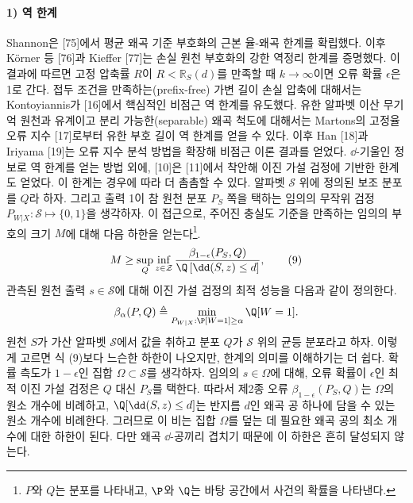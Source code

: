 \paragraph{1) 역 한계}
Shannon은 [75]에서 평균 왜곡 기준 부호화의 근본 율-왜곡 한계를 확립했다.
이후 Körner 등 [76]과 Kieffer [77]는 손실 원천 부호화의 강한 역정리 한계를 증명했다.
이 결과에 따르면 고정 압축률 $R$이 $R<\mathbb{R}_S(d)$를 만족할 때 $k\to\infty$이면 오류 확률 $\epsilon$은 1로 간다.
접두 조건을 만족하는(prefix-free) 가변 길이 손실 압축에 대해서는 Kontoyiannis가 [16]에서 핵심적인 비점근 역 한계를 유도했다.
유한 알파벳 이산 무기억 원천과 유계이고 분리 가능한(separable) 왜곡 척도에 대해서는 Martons의 고정율 오류 지수 [17]로부터 유한 부호 길이 역 한계를 얻을 수 있다.
이후 Han [18]과 Iriyama [19]는 오류 지수 분석 방법을 확장해 비점근 이론 결과를 얻었다.
$\dd$-기울인 정보로 역 한계를 얻는 방법 외에, [10]은 [11]에서 착안해 이진 가설 검정에 기반한 한계도 얻었다. 이 한계는 경우에 따라 더 촘촘할 수 있다.
알파벳 $\mathcal{S}$ 위에 정의된 보조 분포를 $Q$라 하자.
그리고 출력 1이 참 원천 분포 $P_S$ 쪽을 택하는 임의의 무작위 검정 $P_{W|X}:\mathcal{S}\mapsto\{0,1\}$을 생각하자.
이 접근으로, 주어진 충실도 기준을 만족하는 임의의 부호의 크기 $M$에 대해 다음 하한을 얻는다\footnote{$P$와 $Q$는 분포를 나타내고, $\P$와 $\Q$는 바탕 공간에서 사건의 확률을 나타낸다.}.
\begin{equation}
  M \ge \sup_{Q} \inf_{z\in\mathcal{Z}} \frac{\beta_{1-\epsilon}(P_S,Q)}{\Q\left[\dd(S,z)\le d\right]},
  \tag{9}
\end{equation}
관측된 원천 출력 $s\in\mathcal{S}$에 대해 이진 가설 검정의 최적 성능을 다음과 같이 정의한다.
\[
  \beta_\alpha(P,Q)\triangleq\min_{P_{W|X}:\P[W=1]\ge\alpha}\Q[W=1].
\]
원천 $S$가 가산 알파벳 $\mathcal{S}$에서 값을 취하고 분포 $Q$가 $\mathcal{S}$ 위의 균등 분포라고 하자.
이렇게 고르면 식 (9)보다 느슨한 하한이 나오지만, 한계의 의미를 이해하기는 더 쉽다.
확률 측도가 $1-\epsilon$인 집합 $\Omega\subset\mathcal{S}$를 생각하자.
임의의 $s\in\Omega$에 대해, 오류 확률이 $\epsilon$인 최적 이진 가설 검정은 $Q$ 대신 $P_S$를 택한다.
따라서 제2종 오류 $\beta_{1-\epsilon}(P_S,Q)$는 $\Omega$의 원소 개수에 비례하고, $\Q[\dd(S,z)\le d]$는 반지름 $d$인 왜곡 공 하나에 담을 수 있는 원소 개수에 비례한다.
그러므로 이 비는 집합 $\Omega$를 덮는 데 필요한 왜곡 공의 최소 개수에 대한 하한이 된다.
다만 왜곡 $\dd$-공끼리 겹치기 때문에 이 하한은 흔히 달성되지 않는다.

